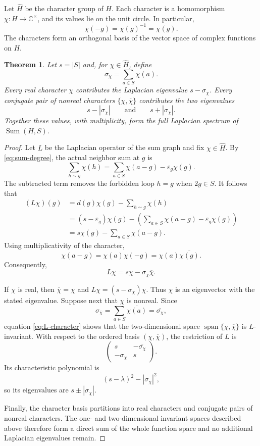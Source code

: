 \documentclass[11pt]{article}
\newtheorem{theorem}{Theorem}[section]
\theoremstyle{definition}
\begin{document}
Let $\widehat H$ be the character group of $H$.  Each character is a
homomorphism $\chi:H\to\mathbb C^\times$, and its values lie on the unit
circle.  In particular,
\[
  \chi(-g)=\chi(g)^{-1}=\overline{\chi(g)}.
\]
The characters form an orthogonal basis of the vector space of complex
functions on $H$.

\begin{theorem}
\label{thm:sum-spectrum}
Let $s=|S|$ and, for $\chi\in\widehat H$, define
\[
  \sigma_\chi=\sum_{a\in S}\chi(a).
\]
Every real character $\chi$ contributes the Laplacian eigenvalue
$s-\sigma_\chi$.  Every conjugate pair of nonreal characters
$\{\chi,\overline\chi\}$ contributes the two eigenvalues
\[
  s-|\sigma_\chi|
  \qquad\text{and}\qquad
  s+|\sigma_\chi|.
\]
Together these values, with multiplicity, form the full Laplacian spectrum
of $\operatorname{Sum}(H,S)$.
\end{theorem}

\begin{proof}
Let $L$ be the Laplacian operator of the sum graph and fix
$\chi\in\widehat H$.  By \eqref{eq:sum-degree}, the actual neighbor sum at
$g$ is
\[
  \sum_{h\sim g}\chi(h)
  =\sum_{a\in S}\chi(a-g)-\varepsilon_g\chi(g).
\]
The subtracted term removes the forbidden loop $h=g$ when $2g\in S$.  It
follows that
\begin{align*}
 (L\chi)(g)
 &=d(g)\chi(g)-\sum_{h\sim g}\chi(h)\\
 &=(s-\varepsilon_g)\chi(g)
   -\left(\sum_{a\in S}\chi(a-g)-\varepsilon_g\chi(g)\right)\\
 &=s\chi(g)-\sum_{a\in S}\chi(a-g).
\end{align*}
Using multiplicativity of the character,
\[
  \chi(a-g)=\chi(a)\chi(-g)
  =\chi(a)\overline{\chi(g)}.
\]
Consequently,
\begin{equation}\label{eq:L-character}
  L\chi=s\chi-\sigma_\chi\overline\chi.
\end{equation}

If $\chi$ is real, then $\overline\chi=\chi$ and $L\chi=(s-\sigma_\chi)\chi$.  Thus $\chi$ is an eigenvector with the stated eigenvalue. Suppose next that $\chi$ is nonreal. Since
\[
  \sigma_{\overline\chi}
  =\sum_{a\in S}\overline{\chi(a)}
  =\overline{\sigma_\chi},
\]
equation \eqref{eq:L-character} shows that the two-dimensional space
$\operatorname{span}\{\chi,\overline\chi\}$ is $L$-invariant.  With respect
to the ordered basis $(\chi,\overline\chi)$, the restriction of $L$ is
\[
  \begin{pmatrix}
  s&-\overline{\sigma_\chi}\\
  -\sigma_\chi&s
  \end{pmatrix}.
\]
Its characteristic polynomial is
\[
  (s-\lambda)^2-|\sigma_\chi|^2,
\]
so its eigenvalues are $s\pm|\sigma_\chi|$.

Finally, the character basis partitions into real characters and conjugate pairs of nonreal characters.  The one- and two-dimensional invariant spaces described above therefore form a direct sum of the whole function space and no additional Laplacian eigenvalues remain.
\end{proof}
\end{document}
